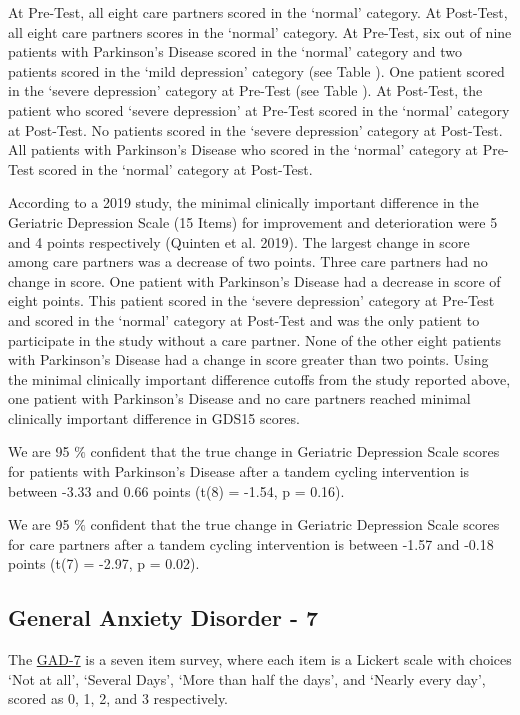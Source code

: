 \documentclass[
]{article}
\begin{document}
At Pre-Test, all eight care partners scored in the `normal' category. At
Post-Test, all eight care partners scores in the `normal' category. At
Pre-Test, six out of nine patients with Parkinson's Disease scored in
the `normal' category and two patients scored in the `mild depression'
category (see Table ). One patient scored in the `severe depression'
category at Pre-Test (see Table ). At Post-Test, the patient who scored
`severe depression' at Pre-Test scored in the `normal' category at
Post-Test. No patients scored in the `severe depression' category at
Post-Test. All patients with Parkinson's Disease who scored in the
`normal' category at Pre-Test scored in the `normal' category at
Post-Test.

According to a 2019 study, the minimal clinically important difference
in the Geriatric Depression Scale (15 Items) for improvement and
deterioration were 5 and 4 points respectively (Quinten et al. 2019).
The largest change in score among care partners was a decrease of two
points. Three care partners had no change in score. One patient with
Parkinson's Disease had a decrease in score of eight points. This
patient scored in the `severe depression' category at Pre-Test and
scored in the `normal' category at Post-Test and was the only patient to
participate in the study without a care partner. None of the other eight
patients with Parkinson's Disease had a change in score greater than two
points. Using the minimal clinically important difference cutoffs from
the study reported above, one patient with Parkinson's Disease and no
care partners reached minimal clinically important difference in GDS15
scores.

We are 95 \(\%\) confident that the true change in Geriatric Depression
Scale scores for patients with Parkinson's Disease after a tandem
cycling intervention is between -3.33 and 0.66 points (t(8) = -1.54, p =
0.16).

We are 95 \(\%\) confident that the true change in Geriatric Depression
Scale scores for care partners after a tandem cycling intervention is
between -1.57 and -0.18 points (t(7) = -2.97, p = 0.02).

\hypertarget{general-anxiety-disorder---7}{%
\subsection{General Anxiety Disorder -
7}\label{general-anxiety-disorder---7}}

The
\href{https://www.hiv.uw.edu/page/mental-health-screening/gad-7\#:~:text=Score\%200\%2D4\%3A\%20Minimal\%20Anxiety,greater\%20than\%2015\%3A\%20Severe\%20Anxiety}{GAD-7}
is a seven item survey, where each item is a Lickert scale with choices
`Not at all', `Several Days', `More than half the days', and `Nearly
every day', scored as 0, 1, 2, and 3 respectively.
\end{document}
